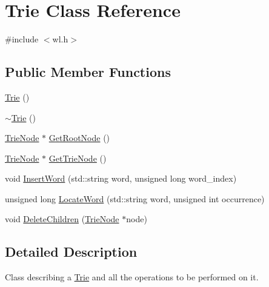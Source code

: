 \hypertarget{classTrie}{\section{Trie Class Reference}
\label{classTrie}
}


{\ttfamily \#include $<$wl.\-h$>$}

\subsection*{Public Member Functions}
\begin{DoxyCompactItemize}
\item 
\hyperlink{classTrie_a6af57e9f25d0d0a2d59eea5a4a802908}{Trie} ()
\item 
\hyperlink{classTrie_abf9d6f48d556e09d1b292412df153a4b}{$\sim$\-Trie} ()
\item 
\hyperlink{classTrieNode}{Trie\-Node} $\ast$ \hyperlink{classTrie_a83e327147b935fd0d767fec4be38003e}{Get\-Root\-Node} ()
\item 
\hyperlink{classTrieNode}{Trie\-Node} $\ast$ \hyperlink{classTrie_ab37aade00b97d03637287e74fb73ca00}{Get\-Trie\-Node} ()
\item 
void \hyperlink{classTrie_a960ae86ba5e1b78eac1701156e0533e3}{Insert\-Word} (std\-::string word, unsigned long word\-\_\-index)
\item 
unsigned long \hyperlink{classTrie_a3aae72bf32a26fc8842aa43e203eb89a}{Locate\-Word} (std\-::string word, unsigned int occurrence)
\item 
void \hyperlink{classTrie_afc71b946b9b4e3c6d7d17102f8032b0a}{Delete\-Children} (\hyperlink{classTrieNode}{Trie\-Node} $\ast$node)
\end{DoxyCompactItemize}


\subsection{Detailed Description}
Class describing a \hyperlink{classTrie}{Trie} and all the operations to be performed on it. 

